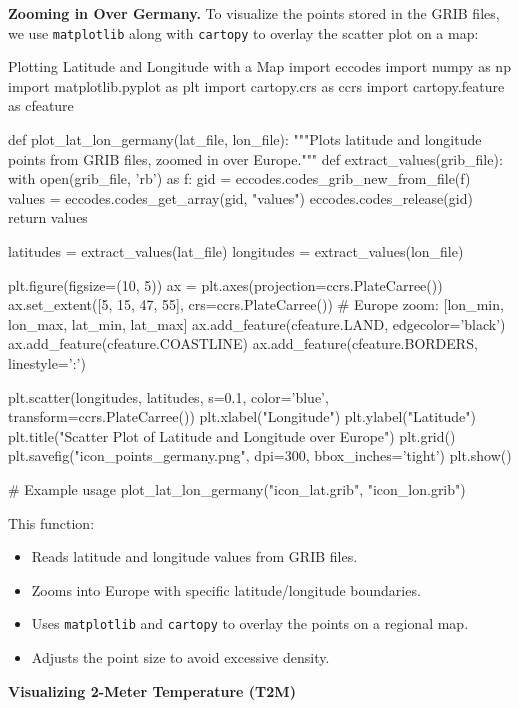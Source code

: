 {\bf Zooming in Over Germany.} To visualize the points stored in the GRIB files, we use \texttt{matplotlib} along with \texttt{cartopy} to overlay the scatter plot on a map:

\begin{codeonly}{Plotting Latitude and Longitude with a Map}
import eccodes
import numpy as np
import matplotlib.pyplot as plt
import cartopy.crs as ccrs
import cartopy.feature as cfeature

def plot_lat_lon_germany(lat_file, lon_file):
    """Plots latitude and longitude points from GRIB files, zoomed in over Europe."""
    def extract_values(grib_file):
        with open(grib_file, 'rb') as f:
            gid = eccodes.codes_grib_new_from_file(f)
            values = eccodes.codes_get_array(gid, "values")
            eccodes.codes_release(gid)
        return values
    
    latitudes = extract_values(lat_file)
    longitudes = extract_values(lon_file)
    
    plt.figure(figsize=(10, 5))
    ax = plt.axes(projection=ccrs.PlateCarree())
    ax.set_extent([5, 15, 47, 55], crs=ccrs.PlateCarree())  # Europe zoom: [lon_min, lon_max, lat_min, lat_max]
    ax.add_feature(cfeature.LAND, edgecolor='black')
    ax.add_feature(cfeature.COASTLINE)
    ax.add_feature(cfeature.BORDERS, linestyle=':')
    
    plt.scatter(longitudes, latitudes, s=0.1, color='blue', transform=ccrs.PlateCarree())
    plt.xlabel("Longitude")
    plt.ylabel("Latitude")
    plt.title("Scatter Plot of Latitude and Longitude over Europe")
    plt.grid()
    plt.savefig("icon_points_germany.png", dpi=300, bbox_inches='tight')
    plt.show()

# Example usage
plot_lat_lon_germany("icon_lat.grib", "icon_lon.grib")
\end{codeonly}

This function:
\begin{itemize}
    \item Reads latitude and longitude values from GRIB files.
    \item Zooms into Europe with specific latitude/longitude boundaries.
    \item Uses \texttt{matplotlib} and \texttt{cartopy} to overlay the points on a regional map.
    \item Adjusts the point size to avoid excessive density.
\end{itemize}

{\bf Visualizing 2-Meter Temperature (T2M)}

